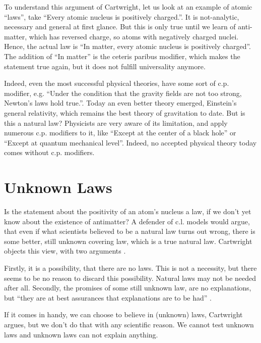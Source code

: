 To understand this argument of Cartwright, let us look at an example
of atomic \enquote{laws}, take \enquote{Every atomic nucleus is positively charged.}.
It is not-analytic, necessary and general at first glance. But this is only true until we
learn of anti-matter, which has reversed charge, so atoms with negatively charged nuclei.
Hence, the actual law is \enquote{In matter, every atomic nucleus is positively charged}.
The addition of \enquote{In matter} is the ceteris paribus modifier, which makes the statement
true again, but it does not fulfill universality anymore.

Indeed, even the most successful physical theories,
have some sort of c.p. modifier, e.g.
\enquote{Under the condition that the gravity fields are not too strong,
    Newton's laws hold true.}.
Today an even better theory emerged, Einstein's general relativity, which remains
the best theory of gravitation to date. But is this a natural law?
Physicists are very aware of its limitation,
and apply numerous c.p. modifiers to it, like \enquote{Except at the center of a black hole}
or \enquote{Except at quantum mechanical level}.
Indeed, no accepted physical theory today comes without c.p. modifiers.

\section*{Unknown Laws}
Is the statement about the positivity of an atom's nucleus a law,
if we don't yet know about the existence of antimatter?
A defender of c.l. models would argue, that even if what scientists believed to be a
natural law turns out wrong, there is some better, still unknown covering law, which is a true
natural law.
Cartwright objects this view, with two arguments \cite[5]{cartwright1980truth}.

Firstly, it is a possibility, that there are no laws.
This is not a necessity, but there seems to be no reason to discard this possibility.
Natural laws may not be needed after all.
Secondly, the promises of some still unknown law,
are no explanations,
but \enquote{they are at best assurances that explanations are to be had} \cite[5]{cartwright1980truth}.

If it comes in handy, we can choose to believe in (unknown) laws, Cartwright argues, but
we don't do that with any scientific reason.
We cannot test unknown laws and unknown laws can not explain anything.



